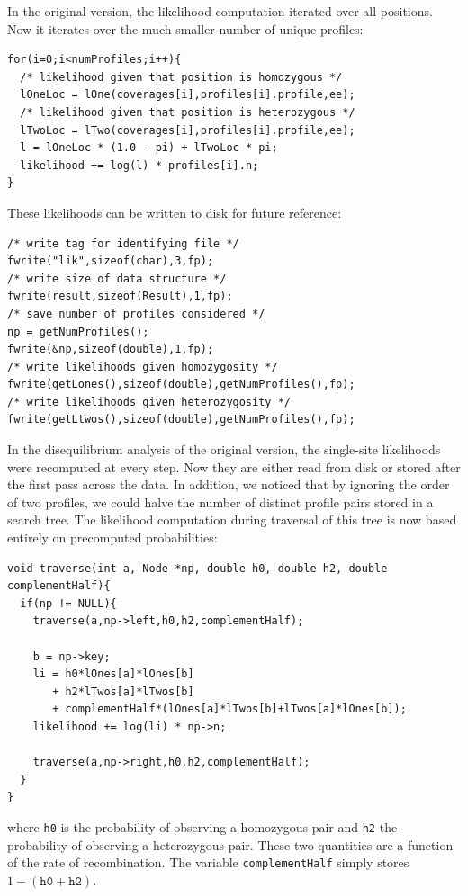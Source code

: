 \documentclass{sig-alternate}
\newcommand{\ty}{\texttt}
\begin{document}
In the original version, the likelihood computation iterated over all
positions. Now it iterates over the much smaller number of unique profiles:
\begin{lstlisting}
for(i=0;i<numProfiles;i++){
  /* likelihood given that position is homozygous */
  lOneLoc = lOne(coverages[i],profiles[i].profile,ee);
  /* likelihood given that position is heterozygous */
  lTwoLoc = lTwo(coverages[i],profiles[i].profile,ee);
  l = lOneLoc * (1.0 - pi) + lTwoLoc * pi;
  likelihood += log(l) * profiles[i].n;
}
\end{lstlisting}
These likelihoods can be written to disk for future reference:
\begin{lstlisting}
/* write tag for identifying file */
fwrite("lik",sizeof(char),3,fp);
/* write size of data structure */
fwrite(result,sizeof(Result),1,fp);
/* save number of profiles considered */
np = getNumProfiles();
fwrite(&np,sizeof(double),1,fp);
/* write likelihoods given homozygosity */
fwrite(getLones(),sizeof(double),getNumProfiles(),fp);
/* write likelihoods given heterozygosity */
fwrite(getLtwos(),sizeof(double),getNumProfiles(),fp);
\end{lstlisting}

In the disequilibrium analysis of the original version, the
single-site likelihoods were recomputed at every step. Now they are
either read from disk or stored after the first pass across the
data. In addition, we noticed that by ignoring the order of two
profiles, we could halve the number of distinct profile pairs stored in
a search tree. The likelihood computation during traversal of this tree is now based entirely on
precomputed probabilities:
\begin{lstlisting}
void traverse(int a, Node *np, double h0, double h2, double complementHalf){
  if(np != NULL){
    traverse(a,np->left,h0,h2,complementHalf);

    b = np->key;
    li = h0*lOnes[a]*lOnes[b]
       + h2*lTwos[a]*lTwos[b]
       + complementHalf*(lOnes[a]*lTwos[b]+lTwos[a]*lOnes[b]);
    likelihood += log(li) * np->n;

    traverse(a,np->right,h0,h2,complementHalf);
  }
}
\end{lstlisting}
where \ty{h0} is the probability of observing a homozygous pair and
\ty{h2} the probability of observing a heterozygous pair. These two
quantities are a function of the rate of recombination. The variable
\ty{complementHalf} simply stores $1-(\ty{h0} + \ty{h2})$.
\end{document}
